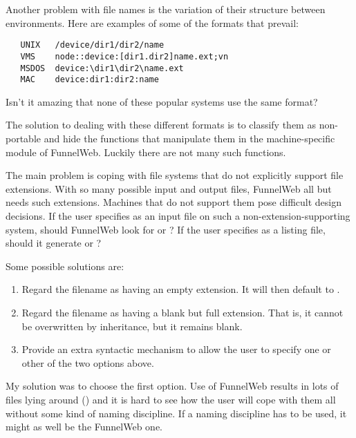 Another problem with file names is the variation of their structure
between environments. Here are examples of some of the formats that prevail:

\begin{verbatim}
   UNIX   /device/dir1/dir2/name
   VMS    node::device:[dir1.dir2]name.ext;vn
   MSDOS  device:\dir1\dir2\name.ext
   MAC    device:dir1:dir2:name
\end{verbatim}

Isn't it amazing that none of these popular systems use the same format?

The solution to dealing with these different formats is to classify them
as non-portable and hide the functions that manipulate them
in the machine-specific module of FunnelWeb.
Luckily there are not many such functions.

The main problem is coping with
file systems that do not
explicitly support file extensions.
With so many possible input and output files, FunnelWeb all but
needs such extensions. Machines that do not support them pose difficult
design decisions.
If the user specifies  as an input file on such
a non-extension-supporting system,
should FunnelWeb look for 
or ? If the user specifies  as a listing file, should
it generate  or ?

Some possible solutions are:

\begin{enumerate}

\item Regard the filename  as having an empty extension. It will then
default to .

\item Regard the filename  as having a blank but full extension.
That is, it cannot be overwritten by inheritance, but it remains blank.

\item Provide an extra syntactic mechanism to allow the user to specify one or
other of the two options above.

\end{enumerate}

My solution was to choose the first option. Use of FunnelWeb
results in lots of files lying around (\eg{}) and it is hard
to see how
the user will cope with them all
without some kind of naming discipline. If a naming discipline
has to be used, it might as well be the FunnelWeb one.

